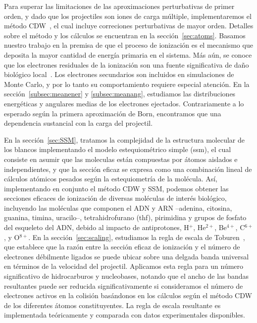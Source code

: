 Para superar las limitaciones de las aproximaciones perturbativas de 
primer orden, y dado que los projectiles son iones de carga múltiple, 
implementaremos el método 
CDW~\cite{galassi2000,fainstein1988,miraglia2008,miraglia2009}, el 
cual incluye correciones perturbativas de mayor orden. Detalles sobre 
el método y los cálculos se encuentran en la sección~\ref{sec:atoms}.
Basamos nuestro trabajo en la premisa de que el proceso de ionización 
es el mecanismo que deposita la mayor cantidad de energía primaria en el
sistema. Más aún, se conoce que los electrones residuales de la ionización
son una fuente significativa de daño biológico local~\cite{Denifl2011}. 
Los electrones secundarios son incluidos en simulaciones de Monte Carlo,
y por lo tanto su comportamiento requiere especial atención.
En la sección~\ref{subsec:meanener} y \ref{subsec:meanang}, estudiamos
las distribuciones energéticas y angulares medias de los electrones 
ejectados. Contrariamente a lo esperado según la primera aproximación 
de Born, encontramos que una dependencia sustancial con la carga del 
projectil. 

En la sección~\ref{sec:SSM}, tratamos la complejidad de la
estructura molecular de los blancos implementando el modelo estequiométrico 
simple (\acs{ssm}), el cual consiste en asumir que las moleculas están 
compuestas por átomos aislados e independientes, y que la sección 
eficaz se expresa como una combinación lineal de cálculos atómicos 
pesados según la estequiometría de la 
molécula. Así, implementando en conjunto el método CDW y SSM, podemos
obtener las secciones eficaces de ionización de diversas moléculas de 
interés biológico, incluyendo las moléculas que componen el ADN y ARN 
--adenina, citosina, guanina, timina, uracilo--, tetrahidrofurano 
(\acs{thf}), pirimidina y grupos de fosfato del esqueleto del ADN, 
debido al impacto de antiprotones, H$^{+}$, He$^{2+}$, Be$^{4+}$, 
C$^{6+}$, y O$^{8+}$. 
En la sección~\ref{sec:scaling}, estudiamos la regla de escala de 
Toburen~\cite{toburen1975,toburen1976}, que establece que la razón entre
la sección eficaz de ionización y el número de electrones débilmente
ligados se puede ubicar sobre una delgada banda universal en términos 
de la velocidad del projectil. Aplicamos esta regla para un número 
significativo de hidrocarburos y nucleobases, notando que el ancho de las
bandas resultantes puede ser reducida significativamente si consideramos
el número de electrones activos en la colisión basándonos en los 
cálculos según el método CDW de los diferentes átomos constituyentes. 
La regla de escala resultante es implementada teóricamente y comparada 
con datos experimentales disponibles.

